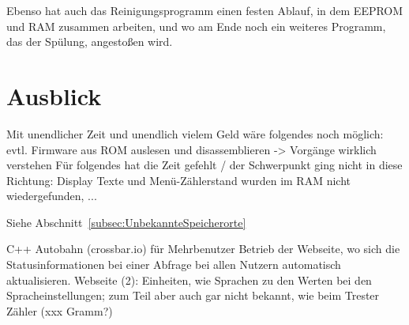Ebenso hat auch das Reinigungsprogramm einen festen Ablauf, in dem \ac{EEPROM} und \ac{RAM} zusammen arbeiten, und wo am Ende noch ein weiteres Programm, das der Spülung, angestoßen wird.

\section{Ausblick}\todo
Mit unendlicher Zeit und unendlich vielem Geld wäre folgendes noch möglich: evtl. \todo
Firmware aus ROM auslesen und disassemblieren -> Vorgänge wirklich verstehen
Für folgendes hat die Zeit gefehlt / der Schwerpunkt ging nicht in diese Richtung: Display Texte und Menü-Zählerstand wurden im RAM nicht wiedergefunden, ...

Siehe Abschnitt~\ref{subsec:UnbekannteSpeicherorte}

C++ Autobahn (crossbar.io) für Mehrbenutzer Betrieb der Webseite, wo sich die Statusinformationen bei einer Abfrage bei allen Nutzern automatisch aktualisieren.
Webseite (2): Einheiten, wie Sprachen zu den Werten bei den Spracheinstellungen; zum Teil aber auch gar nicht bekannt, wie beim Trester Zähler (xxx Gramm?)
